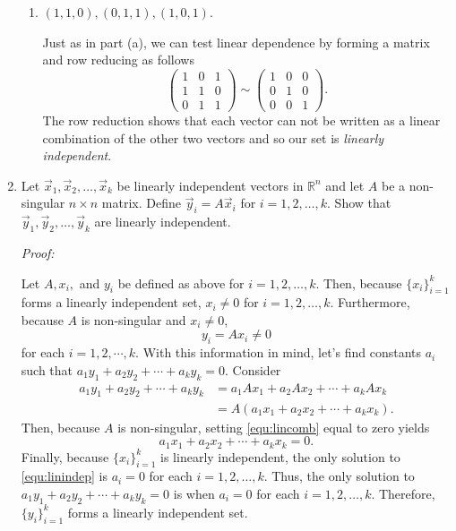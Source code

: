 \documentclass[a4paper,12pt]{article}
\newcommand{\reals}{\mathbb{R}}
\newenvironment{proof}[2][$\square$]
    {\setlength{\parskip}{0pt}\par\textit{Proof:} #2\setlength{\parskip}{0.25cm}
        \savebox{\qed}{#1}
        \begin{adjustwidth}{\widthof{Proof:}}{}
    }
    {
        \hfill\usebox{\qed}\end{adjustwidth}
    }
\begin{document}
\begin{enumerate}[label = \arabic*.]
\begin{enumerate}[label = (\alph*)]
		\item $ (1,1,0), (0,1,1), (1,0,1) $.
		
		Just as in part (a), we can test linear dependence by forming a matrix and row reducing as follows
		\[
			\begin{pmatrix}
				1 & 0 & 1 \\
				1 & 1 & 0 \\
				0 & 1 & 1
			\end{pmatrix}
			\sim
			\begin{pmatrix}
				1 & 0 & 0 \\
				0 & 1 & 0 \\
				0 & 0 & 1
			\end{pmatrix}.
		\]
		The row reduction shows that each vector can not be written as a linear combination of the other two vectors and so our set is \emph{linearly independent}.
	\end{enumerate}

	\newpage
	\item Let $ \vec{x}_1, \vec{x}_2, \ldots, \vec{x}_k $ be linearly independent vectors in $ \reals^n $ and let $ A $ be a non-singular $ n \times n $ matrix. Define $ \vec{y}_i = A \vec{x}_i $ for $ i = 1, 2, \ldots, k $. Show that $ \vec{y}_1, \vec{y}_2, \ldots, \vec{y}_k $ are linearly independent.
	
	\begin{proof}{}
		Let $A, x_i, $ and $ y_i $ be defined as above for $ i = 1, 2, \ldots, k $. Then, because $ \{x_i\}_{i=1}^k $ forms a linearly independent set, $ x_i \neq 0 $ for $ i = 1,2, \ldots, k $. Furthermore, because $ A $ is non-singular and $ x_i \neq 0 $,
		\[
			y_i = A x_i \neq 0
		\]
		for each $ i = 1,2, \cdots, k $. With this information in mind, let's find constants $ a_i $ such that $ a_1 y_1 + a_2 y_2 + \cdots + a_k y_k = 0 $. Consider
		\begin{align*}
			a_1 y_1 + a_2 y_2 + \cdots + a_k y_k &= a_1 A x_1 + a_2 A x_2 + \cdots + a_k A x_k \\
			&= A (a_1 x_1 + a_2 x_2 + \cdots + a_k x_k). \label{equ:lincomb}\tag{$*$}
		\end{align*}
		Then, because $ A $ is non-singular, setting \eqref{equ:lincomb} equal to zero yields
		\begin{equation}
			a_1 x_1 + a_2 x_2 + \cdots + a_k x_k = 0. \label{equ:linindep}
		\end{equation}
		Finally, because $ \{x_i\}_{i=1}^k $ is linearly independent, the only solution to \eqref{equ:linindep} is $ a_i = 0 $ for each $ i = 1, 2, \ldots, k $. Thus, the only solution to $ a_1 y_1 + a_2 y_2 + \cdots + a_k y_k = 0 $ is when $ a_i = 0 $ for each $ i = 1, 2, \ldots, k $. Therefore, $ \{y_i\}_{i=1}^k $ forms a linearly independent set.
	\end{proof}


\end{enumerate}
\end{document}

